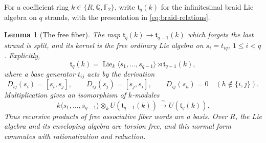\documentclass[11pt]{article}
\newcommand{\Q}{\mathbb Q}
\newcommand{\F}{{\mathbb F_2}}
\newcommand{\Lie}{\operatorname{Lie}}
\newtheorem{lemma}[theorem]{Lemma}
\theoremstyle{definition}
\theoremstyle{remark}
\numberwithin{equation}{section}
\begin{document}
For a coefficient ring \(k\in\{R,\Q,\F\}\), write
\(\mathfrak t_q(k)\) for the infinitesimal braid Lie algebra on
\(q\) strands, with the presentation in \eqref{eq:braid-relations}.

\begin{lemma}[The free fiber]\label{lem:free-fiber}
The map \(\mathfrak t_q(k)\longrightarrow\mathfrak t_{q-1}(k)\)
which forgets the last strand is split, and its kernel is the free
ordinary Lie algebra on \(s_i=t_{iq}\), \(1\leq i<q\).  Explicitly,
\begin{equation}\label{eq:free-fiber}
 \mathfrak t_q(k)
  =\Lie_k\langle s_1,\ldots,s_{q-1}\rangle
        \rtimes\mathfrak t_{q-1}(k),
\end{equation}
where a base generator \(t_{ij}\) acts by the derivation
\begin{equation}\label{eq:free-fiber-action}
 D_{ij}(s_i)=[s_i,s_j],\qquad
 D_{ij}(s_j)=[s_j,s_i],\qquad
 D_{ij}(s_h)=0\quad(h\notin\{i,j\}).
\end{equation}
Multiplication gives an isomorphism of \(k\)-modules
\begin{equation}\label{eq:enveloping-fiber}
 k\langle s_1,\ldots,s_{q-1}\rangle
       \otimes_k U(\mathfrak t_{q-1}(k))
       \xrightarrow{\ \sim\ }U(\mathfrak t_q(k)).
\end{equation}
Thus recursive products of free associative fiber words are a basis.
Over \(R\), the Lie algebra and its enveloping algebra are torsion
free, and this normal form commutes with rationalization and reduction.
\end{lemma}
\end{document}
